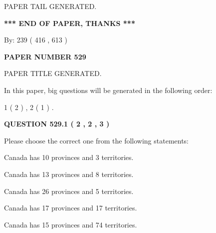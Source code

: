 \documentclass[12pt]{article}
\begin{document}
   
   
\vspace{2.0in} PAPER TAIL GENERATED.
   
   
   
   
\vspace{1.0in} 
{\textbf{\large{ *** END OF PAPER, THANKS *** }}} 
   
   
\hspace{1.0in} By: 
 239 ( 416 ,  613 )
   
   
   
   
\newpage 
\setcounter{page}{ 
   529001 } 
   
   
   
   
 {\textbf{ \Large{ PAPER NUMBER  529  }}}
   
   
\vspace{0.2in}
   
   
   
   
   
   
   
   
 \vspace{0.2in}
 
 
 
 
   
   
 PAPER TITLE GENERATED.
   
   
   
\vspace{0.2in}
   
In this paper, big questions will be generated in the following order: 
   
   
   1 ( 2 )
 ,
   2 ( 1 )
 .
  
\vspace{0.2in}
  
{\textbf{\Large{QUESTION
529.1 
 ( 2 , 2 , 3 )
}}}
  
  
Please choose the correct one from the following statements:
 
 
Canada has 10  provinces and 3 territories.
 
 
Canada has  13 provinces and  8 territories.
 
 
Canada has  26 provinces and  5 territories.
 
 
Canada has  17 provinces and  17 territories.
 
 
Canada has  15 provinces and  74 territories.
 
\end{document}
